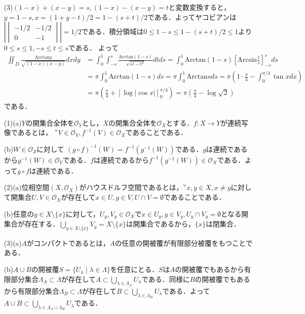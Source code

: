 \documentclass[
		book,
		head_space=20mm,
		foot_space=20mm,
		gutter=10mm,
		line_length=190mm
]{jlreq}
\begin{document}
(3)$(1-x)+(x-y)=s,(1-x)-(x-y)=t$と変数変換すると，$y=1-s,x=(1+y-t)/2=1-(s+t)/2$である．よってヤコビアンは$|\begin{vmatrix}
	-1/2 & -1/2\\
	0 & -1 
\end{vmatrix}|=1/2$である．積分領域は$0\le 1-s\le 1-(s+t)/2 \le 1$より$0\le s\le 1,-s \le t \le s $である．
よって \begin{align}
	\iint_D \frac{ \mathrm{Arctan}  y}{\sqrt{(1-x)(x-y)}}dxdy&=\int_0^1 \int_{-s}^s \frac{ \mathrm{Arctan}  (1-s)}{\sqrt{s^2-t^2}}dtds=
	\int_0^1 \mathrm{Arctan}(1-s) \left[ \mathrm{Arcsin} \frac{t}{s} \right]_{-s}^s ds\\
	&=\pi\int_0^1 \mathrm{Arctan}(1-s) ds=\pi\int_0^1 \mathrm{Arctan} s ds=\pi(1\cdot\frac{\pi}{4}-\int_0^{\pi/4} \tan x dx) \\
	&=\pi(\frac{\pi}{4}+[\log |\cos x|]_0^{\pi/4})=\pi(\frac{\pi}{4}-\log \sqrt{2}) 
\end{align}である．

(1)(a)$Y$の開集合全体を$\mathcal{O}_Y$とし，$X$の開集合全体を$\mathcal{O}_X$とする．$f \colon X \rightarrow Y$が連続写像であるとは，
${}^\forall V \in \mathcal{O}_Y,f^{-1}(V) \in \mathcal{O}_X$であることである．

(b)$W \in \mathcal{O}_Z$に対して
$(g\circ f)^{-1}(W)=f^{-1}(g^{-1}(W))$である．$g$は連続であるから$g^{-1}(W) \in \mathcal{O}_Y$である．$f$は連続であるから$f^{-1}(g^{-1}(W)) \in \mathcal{O}_X$である．よって$g\circ f$は連続である．

(2)(a)位相空間$(X,\mathcal{O}_X)$がハウスドルフ空間であるとは，${}^\forall x,y \in X,x\neq y$に対して開集合$U,V \in \mathcal{O}_X$が存在して$x \in U,y \in V,U \cap V = \emptyset$であることである．

(b)任意の$y \in X \setminus \{ x\}$に対して，$U_y,V_y \in \mathcal{O}_X $で$x \in U_y , y \in V_y ,U_y \cap V_y = \emptyset$となる開集合が存在する．$\bigcup\limits_{y \in X \setminus \{ x\}} V_y=X \setminus \{ x\}$は開集合であるから，$\{ x\}$は閉集合．

(3)(a)$A$がコンパクトであるとは，$A$の任意の開被覆が有限部分被覆をもつことである．

(b)$A \cup B$の開被覆$S=\{U_\lambda\mid \lambda\in \Lambda\}$を任意にとる．$S$は$A$の開被覆でもあるから有限部分集合$\Lambda_A \subset \Lambda$が存在して$A \subset \bigcup\limits_{\lambda \in \Lambda_A} U_\lambda$である．同様に$B$の開被覆でもあるから有限部分集合$\Lambda_B \subset \Lambda$が存在して$B \subset \bigcup\limits_{\lambda \in \Lambda_B} U_\lambda$である．よって$A \cup B \subset \bigcup\limits_{\lambda \in \Lambda_A \cup \Lambda_B} U_\lambda$である．






	
	
\end{document}
